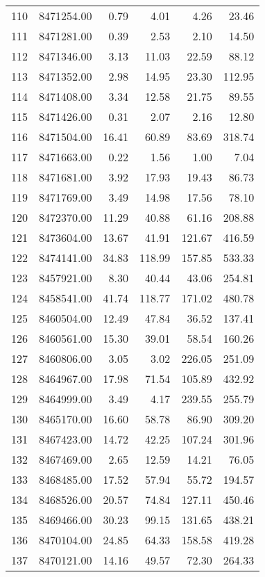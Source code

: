 \begin{table}[ht]
\begin{tabular}{rrrrrr}
  110 & 8471254.00 & 0.79 & 4.01 & 4.26 & 23.46 \\ 
  111 & 8471281.00 & 0.39 & 2.53 & 2.10 & 14.50 \\ 
  112 & 8471346.00 & 3.13 & 11.03 & 22.59 & 88.12 \\ 
  113 & 8471352.00 & 2.98 & 14.95 & 23.30 & 112.95 \\ 
  114 & 8471408.00 & 3.34 & 12.58 & 21.75 & 89.55 \\ 
  115 & 8471426.00 & 0.31 & 2.07 & 2.16 & 12.80 \\ 
  116 & 8471504.00 & 16.41 & 60.89 & 83.69 & 318.74 \\ 
  117 & 8471663.00 & 0.22 & 1.56 & 1.00 & 7.04 \\ 
  118 & 8471681.00 & 3.92 & 17.93 & 19.43 & 86.73 \\ 
  119 & 8471769.00 & 3.49 & 14.98 & 17.56 & 78.10 \\ 
  120 & 8472370.00 & 11.29 & 40.88 & 61.16 & 208.88 \\ 
  121 & 8473604.00 & 13.67 & 41.91 & 121.67 & 416.59 \\ 
  122 & 8474141.00 & 34.83 & 118.99 & 157.85 & 533.33 \\ 
  123 & 8457921.00 & 8.30 & 40.44 & 43.06 & 254.81 \\ 
  124 & 8458541.00 & 41.74 & 118.77 & 171.02 & 480.78 \\ 
  125 & 8460504.00 & 12.49 & 47.84 & 36.52 & 137.41 \\ 
  126 & 8460561.00 & 15.30 & 39.01 & 58.54 & 160.26 \\ 
  127 & 8460806.00 & 3.05 & 3.02 & 226.05 & 251.09 \\ 
  128 & 8464967.00 & 17.98 & 71.54 & 105.89 & 432.92 \\ 
  129 & 8464999.00 & 3.49 & 4.17 & 239.55 & 255.79 \\ 
  130 & 8465170.00 & 16.60 & 58.78 & 86.90 & 309.20 \\ 
  131 & 8467423.00 & 14.72 & 42.25 & 107.24 & 301.96 \\ 
  132 & 8467469.00 & 2.65 & 12.59 & 14.21 & 76.05 \\ 
  133 & 8468485.00 & 17.52 & 57.94 & 55.72 & 194.57 \\ 
  134 & 8468526.00 & 20.57 & 74.84 & 127.11 & 450.46 \\ 
  135 & 8469466.00 & 30.23 & 99.15 & 131.65 & 438.21 \\ 
  136 & 8470104.00 & 24.85 & 64.33 & 158.58 & 419.28 \\ 
  137 & 8470121.00 & 14.16 & 49.57 & 72.30 & 264.33 \\ 

\end{tabular}
\end{table}
